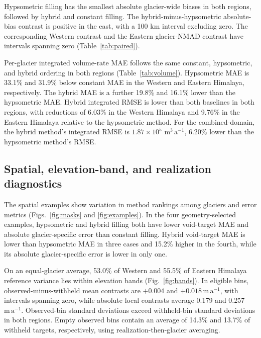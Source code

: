 \documentclass[tc,manuscript]{copernicus}
\newcommand{\rate}{\ensuremath{\mathrm{m\,a^{-1}}}}
\newcommand{\volrate}{\ensuremath{\mathrm{m^3\,a^{-1}}}}
\begin{document}

\FloatBarrier

Hypsometric filling has the smallest absolute glacier-wide biases in both regions, followed by hybrid and constant filling. The hybrid-minus-hypsometric absolute-bias contrast is positive in the east, with a 100 km interval excluding zero. The corresponding Western contrast and the Eastern glacier-NMAD contrast have intervals spanning zero (Table~\ref{tab:paired}).



Per-glacier integrated volume-rate MAE follows the same constant, hypsometric, and hybrid ordering in both regions (Table~\ref{tab:volume}). Hypsometric MAE is 33.1\% and 31.9\% below constant MAE in the Western and Eastern Himalaya, respectively. The hybrid MAE is a further 19.8\% and 16.1\% lower than the hypsometric MAE. Hybrid integrated RMSE is lower than both baselines in both regions, with reductions of 6.03\% in the Western Himalaya and 9.76\% in the Eastern Himalaya relative to the hypsometric method. For the combined-domain, the hybrid method's integrated RMSE is $1.87\times 10^{5}$ \volrate, 6.20\% lower than the hypsometric method's RMSE.


\FloatBarrier

\subsection{Spatial, elevation-band, and realization diagnostics}

The spatial examples show variation in method rankings among glaciers and error metrics (Figs.~\ref{fig:masks} and \ref{fig:examples}). In the four geometry-selected examples, hypsometric and hybrid filling both have lower void-target MAE and absolute glacier-specific error than constant filling. Hybrid void-target MAE is lower than hypsometric MAE in three cases and 15.2\% higher in the fourth, while its absolute glacier-specific error is lower in only one.

On an equal-glacier average, 53.0\% of Western and 55.5\% of Eastern Himalaya reference variance lies within elevation bands (Fig.~\ref{fig:bands}). In eligible bins, observed-minus-withheld mean contrasts are $+0.004$ and $+0.018$\,\rate, with intervals spanning zero, while absolute local contrasts average 0.179 and 0.257\,\rate. Observed-bin standard deviations exceed withheld-bin standard deviations in both regions. Empty observed bins contain an average of 14.3\% and 13.7\% of withheld targets, respectively, using realization-then-glacier averaging.
\end{document}
